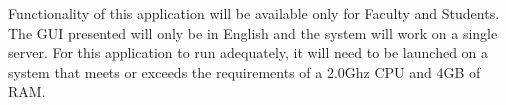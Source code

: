 
\label{sec:constraints}

Functionality of this application will be available only for Faculty and
Students. The GUI presented will only be in English and the system will work on
a single server. For this application to run adequately, it will need to be
launched on a system that meets or exceeds the requirements of a 2.0Ghz CPU and
4GB of RAM.


